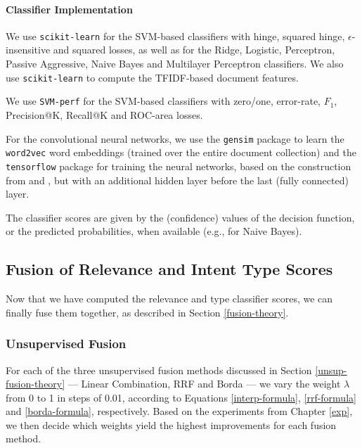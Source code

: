 \paragraph{Classifier Implementation}
We use \texttt{scikit-learn} \cite{scikit} for the SVM-based classifiers with hinge,
squared hinge, $\epsilon$-insensitive and squared losses, as well as for the Ridge, Logistic, Perceptron,
Passive Aggressive, Naive Bayes and Multilayer Perceptron classifiers.
We also use \texttt{scikit-learn} to compute the TFIDF-based document features.

We use \texttt{SVM-perf} \cite{svmperf3,svmperf1,svmperf2}
for the SVM-based classifiers with zero/one, error-rate, $F_1$, Precision@K, Recall@K and ROC-area losses.

For the convolutional neural networks, we use the \texttt{gensim} package \cite{gensim} to learn the \texttt{word2vec}
word embeddings (trained over the entire document collection)
and the \texttt{tensorflow} package \cite{tf} for training the neural networks, based on the construction
from \cite{cnn} and \cite{cnn-code}, but with an additional hidden layer before the last (fully connected) layer.

The classifier scores are given by the (confidence) values of the decision function, or the predicted probabilities,
when available (e.g., for Naive Bayes).

\subsection{Fusion of Relevance and Intent Type Scores}
Now that we have computed the relevance and type classifier scores, we can finally fuse them together,
as described in Section \ref{fusion-theory}.

\subsubsection{Unsupervised Fusion}\label{impl-unsup}
For each of the three unsupervised fusion methods discussed in Section \ref{unsup-fusion-theory}
--- Linear Combination, RRF and Borda --- we vary the weight $\lambda$ from 0 to 1 in steps of 0.01,
according to Equations \ref{interp-formula}, \ref{rrf-formula} and \ref{borda-formula}, respectively.
Based on the experiments from Chapter \ref{exp}, we then decide
which weights yield the highest improvements for each fusion method.

